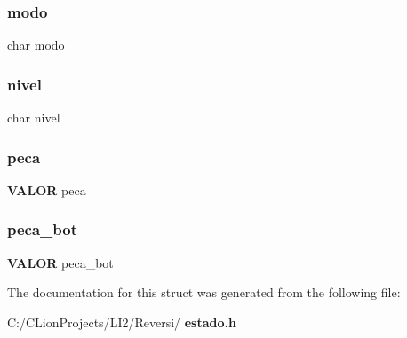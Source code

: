 \subsubsection{modo}
{\footnotesize\ttfamily char modo}

\mbox{\label{structestado_a076b830cec48fef5d424eafad8d4f544}} 
\subsubsection{nivel}
{\footnotesize\ttfamily char nivel}

\mbox{\label{structestado_ab36ee9db06349bf2088d6b16381fdef1}} 
\subsubsection{peca}
{\footnotesize\ttfamily \textbf{ V\+A\+L\+OR} peca}

\mbox{\label{structestado_a83605003e97692f5b963304daaf169f4}} 
\subsubsection{peca\_bot}
{\footnotesize\ttfamily \textbf{ V\+A\+L\+OR} peca\+\_\+bot}



The documentation for this struct was generated from the following file\+:\begin{DoxyCompactItemize}
\item 
C\+:/\+C\+Lion\+Projects/\+L\+I2/\+Reversi/\textbf{ estado.\+h}\end{DoxyCompactItemize}
